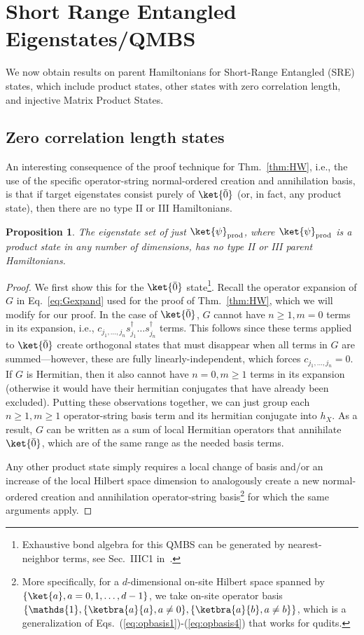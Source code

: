\documentclass[prx,letterpaper,aps,superscriptaddress,floatfix,twocolumn,nofootinbib]{revtex4-2}
\newtheorem{prop}{Proposition}
\theoremstyle{definition}
\begin{document}
%
\section{Short Range Entangled Eigenstates/QMBS}
\label{sec:SREQMBS}
%
We now obtain results on parent Hamiltonians for Short-Range Entangled (SRE) states, which include product states, other states with zero correlation length, and injective Matrix Product States.
%
\subsection{Zero correlation length states}
%
An interesting consequence of the proof technique for Thm.~\ref{thm:HW}, i.e., the use of the specific operator-string normal-ordered creation and annihilation basis, is that if target eigenstates consist purely of $\ket{\bar{0}}$ (or, in fact, any product state), then there are no type II or III Hamiltonians.
%
\begin{prop}
\label{prop:0noHIIHIII}
    The eigenstate set of just $\ket{\psi}_{\rm prod}$, where $\ket{\psi}_{\rm prod}$ is a product state in any number of dimensions, has no type II or III parent Hamiltonians.
\end{prop}
%
\begin{proof}
We first show this for the $\ket{\bar{0}}$ state\footnote{Exhaustive bond algebra for this QMBS can be generated by nearest-neighbor terms, see Sec.~IIIC1 in~\cite{moudgalya2024symmetries}.}.
%
Recall the operator expansion of $G$ in Eq.~\eqref{eq:Gexpand} used for the proof of Thm.~\ref{thm:HW}, which we will modify for our proof.
%
In the case of $\ket{\bar{0}}$, $G$ cannot have $n \geq 1, m = 0$ terms in its expansion, i.e., $c_{j_1,...,j_n}s_{j_1}^\dagger \dots s_{j_n}^\dagger$ terms.
%
This follows since these terms applied to $\ket{\bar{0}}$ create orthogonal states that must disappear when all terms in $G$ are summed---however, these are fully linearly-independent, which forces $c_{j_1,...,j_n}=0$.
%
If $G$ is Hermitian, then it also cannot have $n = 0, m \geq 1$ terms in its expansion (otherwise it would have their hermitian conjugates that have already been excluded).
%
Putting these observations together, we can just group each $n \geq 1, m \geq 1$ operator-string basis term and its hermitian conjugate into $h_X$. As a result, $G$ can be written as a sum of local Hermitian operators that annihilate $\ket{\bar{0}}$, which are of the same range as the needed basis terms.
%

%
Any other product state simply requires a local change of basis and/or an increase of the local Hilbert space dimension to analogously create a new normal-ordered creation and annihilation operator-string basis\footnote{
More specifically, for a $d$-dimensional on-site Hilbert space spanned by $\{ \ket{a}, a=0,1,\dots,d-1 \}$, we take on-site operator basis $\{\mathds{1}, \{\ketbra{a}{a}, a \neq 0\}, \{\ketbra{a}{b}, a \neq b\}\}$, which is a generalization of Eqs.~(\ref{eq:opbasis1})-(\ref{eq:opbasis4}) that works for qudits.} for which the same arguments apply.
%
\end{proof}
%
\end{document}
